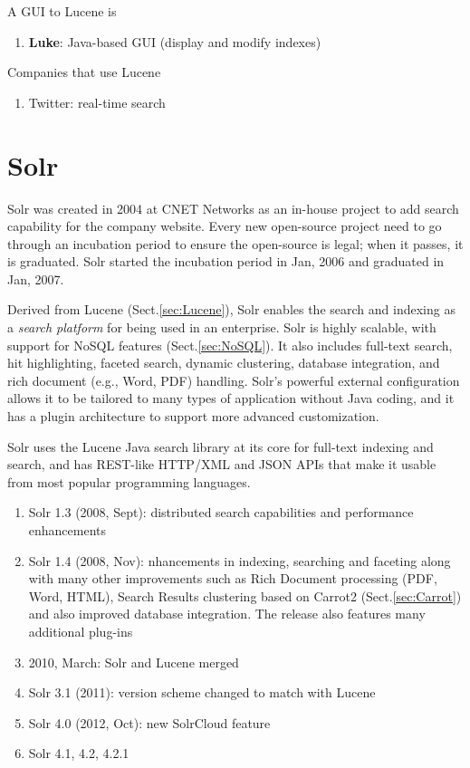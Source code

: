 A GUI to Lucene is 
\begin{enumerate}
  \item {\bf Luke}: Java-based GUI (display and modify indexes)
\end{enumerate}

Companies that use Lucene
\begin{enumerate}
  \item Twitter: real-time search
\end{enumerate}

\section{Solr}
\label{sec:Solr}

Solr was created in 2004 at CNET Networks as an in-house project to add search
capability for the company website. Every new open-source project need to go
through an incubation period to ensure the open-source is legal; when it
passes, it is graduated. Solr started the incubation period in Jan, 2006 and
graduated in Jan, 2007.

Derived from Lucene (Sect.\ref{sec:Lucene}), Solr enables the search and
indexing as  a {\it search platform} for being used in an enterprise.
Solr is highly scalable, with support for NoSQL features (Sect.\ref{sec:NoSQL}).
It also includes full-text search, hit highlighting, faceted search, dynamic
clustering, database integration, and rich document (e.g., Word, PDF) handling.
Solr's powerful external configuration allows it to be tailored to many types of
application without Java coding, and it has a plugin architecture to support
more advanced customization.

Solr uses the Lucene Java search library at its core for full-text indexing and
search, and has REST-like HTTP/XML and JSON APIs that make it usable from most
popular programming languages.

\begin{enumerate}
  \item Solr 1.3 (2008, Sept): distributed search capabilities and performance
  enhancements 
  \item Solr 1.4 (2008, Nov): nhancements in indexing, searching and faceting
  along with many other improvements such as Rich Document processing (PDF,
  Word, HTML), Search Results clustering based on Carrot2 (Sect.\ref{sec:Carrot})
  and also improved database integration. The release also features many additional plug-ins   
  
  \item 2010, March: Solr and Lucene merged
  \item Solr 3.1 (2011): version scheme changed to match with Lucene
  \item Solr 4.0 (2012, Oct): new SolrCloud feature
  \item Solr 4.1, 4.2, 4.2.1
\end{enumerate}


